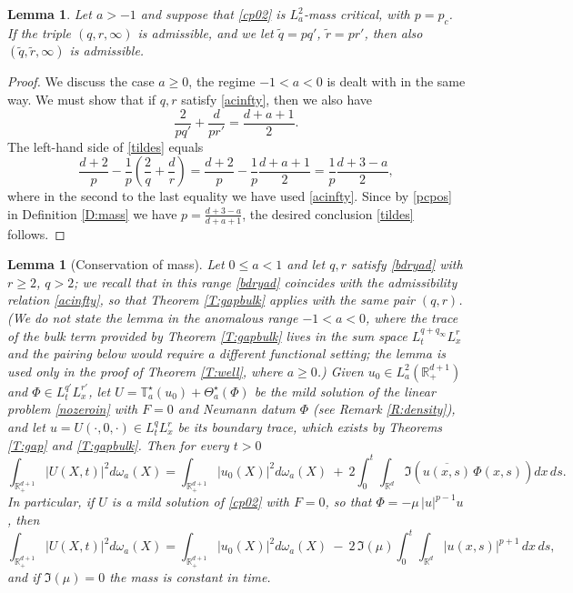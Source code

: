 \documentclass[11pt,letter]{amsart}
\def \RN {\mathbb{R}_+^{d+1}}
\newcommand{\Rd}{\mathbb R^d}
\numberwithin{equation}{section}
\newtheorem{lemma}[theorem]{Lemma}
\numberwithin{equation}{section}
\begin{document}
\begin{lemma}\label{L:mass}
Let $a>-1$ and suppose that \eqref{cp02} is $L^2_a$-mass critical, with $p = p_c$. If the triple $(q,r,\infty)$ is admissible, and we let $\tilde q = p q'$, $\tilde r = p r'$, then also $(\tilde q,\tilde r,\infty)$ is admissible. 
\end{lemma}

\begin{proof}
We discuss the case $a\ge 0$, the regime $-1<a<0$ is dealt with in the same way. We must show that if $q, r$ satisfy \eqref{acinfty}, then we also have
\begin{equation}\label{tildes}
\frac 2{pq'} + \frac{d}{pr'} = \frac{d+a+1}2.
\end{equation}
The left-hand side of \eqref{tildes} equals 
\[
\frac{d+2}p - \frac 1p\left(\frac 2q + \frac dr\right) = \frac{d+2}p - \frac 1p \frac{d+a+1}2 = \frac 1p \frac{d+3-a}2,
\]
where in the second to the last equality we have used \eqref{acinfty}. Since by \eqref{pcpos} in Definition \ref{D:mass} we have $p = \frac{d+3-a}{d+a+1}$, the desired conclusion \eqref{tildes} follows.



\end{proof}

\begin{lemma}[Conservation of mass]\label{L:masscon}
Let $0\le a<1$ and let $q, r$ satisfy \eqref{bdryad} with $r\ge2$, $q>2$; we recall that in this range \eqref{bdryad} coincides with the admissibility relation \eqref{acinfty}, so that Theorem \ref{T:gapbulk} applies with the same pair $(q,r)$. (We do not state the lemma in the anomalous range $-1<a<0$, where the trace of the bulk term provided by Theorem \ref{T:gapbulk} lives in the sum space $L^{q+q_\infty}_t L^r_x$ and the pairing below would require a different functional setting; the lemma is used only in the proof of Theorem \ref{T:well}, where $a\ge0$.) Given $u_0\in L^2_a(\RN)$ and $\Phi\in L^{q'}_tL^{r'}_x$, let $U = \mathbb T^\star_a(u_0) + \Theta^\star_a(\Phi)$ be the mild solution of the linear problem \eqref{nozeroin} with $F=0$ and Neumann datum $\Phi$ (see Remark \ref{R:density}), and let $u = U(\cdot,0,\cdot)\in L^q_tL^r_x$ be its boundary trace, which exists by Theorems \ref{T:gap} and \ref{T:gapbulk}. Then for every $t>0$
\begin{equation}\label{timeder}
\int_{\RN} |U(X,t)|^2 d\omega_a(X) = \int_{\RN} |u_0(X)|^2 d\omega_a(X)\ +\ 2\int_0^t\int_{\Rd} \Im\left(\overline{u(x,s)}\, \Phi(x,s)\right) dx\, ds .
\end{equation}
In particular, if $U$ is a mild solution of \eqref{cp02} with $F=0$, so that $\Phi = -\mu\,|u|^{p-1}u$, then
\begin{equation}\label{timeder2}
\int_{\RN} |U(X,t)|^2 d\omega_a(X) = \int_{\RN} |u_0(X)|^2 d\omega_a(X)\ -\ 2\,\Im(\mu) \int_0^t\int_{\Rd} |u(x,s)|^{p+1}\, dx\, ds,
\end{equation}
and if $\Im(\mu) = 0$ the \emph{mass} is constant in time.
\end{lemma}
\end{document}
